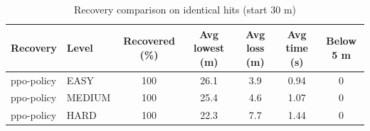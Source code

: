 \begin{table}[h]
\centering
\caption{Recovery comparison on identical hits (start 30 m)}
\begin{tabular}{llccccc}
\hline
Recovery & Level & Recovered (\%) & Avg lowest (m) & Avg loss (m) & Avg time (s) & Below 5 m \\
\hline
ppo-policy & EASY & 100 & 26.1 & 3.9 & 0.94 & 0 \\
ppo-policy & MEDIUM & 100 & 25.4 & 4.6 & 1.07 & 0 \\
ppo-policy & HARD & 100 & 22.3 & 7.7 & 1.44 & 0 \\
\hline
\end{tabular}
\end{table}
